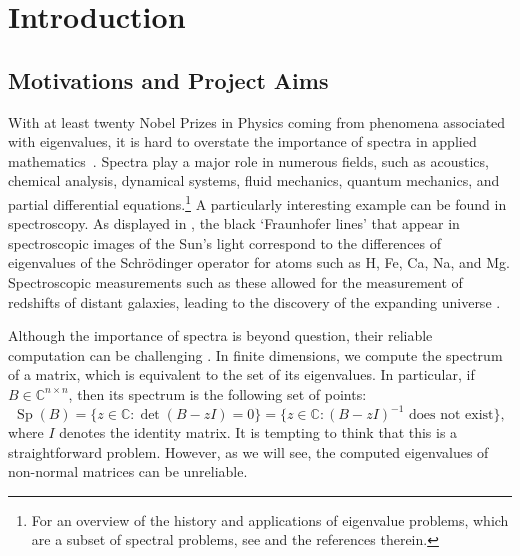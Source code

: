 \chapter{Introduction}

\section{Motivations and  Project Aims}


With at least twenty Nobel Prizes in Physics coming from phenomena associated with eigenvalues, it is hard to overstate the importance of spectra in applied mathematics~\cite{NickEssay}. 
Spectra play a major role in numerous fields, such as acoustics, chemical analysis, dynamical systems, fluid mechanics, quantum mechanics, and partial differential equations.\footnote{For an overview of the history and applications of eigenvalue problems, which are a subset of spectral problems, see \cite[Chapter 1]{Nick} and the references therein.} A particularly interesting example can be found in spectroscopy. As displayed in , the black `Fraunhofer lines' that appear in spectroscopic images of the Sun's light correspond to the differences of eigenvalues of the Schrödinger operator for atoms such as H, Fe, Ca, Na, and Mg. Spectroscopic measurements such as these allowed for the measurement of redshifts of distant galaxies, leading to the discovery of the expanding universe \cite[Chapter~1]{Nick}.


Although the importance of spectra is beyond question, their reliable computation can be challenging \cite{Forward}. 
In finite dimensions, we compute the spectrum of a matrix, which is equivalent to the set of its eigenvalues. In particular, if
$B \in \mathbb{C}^{n\times n}$, then its spectrum is the following set of points:
\begin{equation} \label{matrix spec}
    \operatorname{Sp}(B) = \{z \in \mathbb{C}: \det (B-zI) = 0 \} = \{z \in \mathbb{C}: (B-zI)^{-1} \text{ does not exist} \},
\end{equation}
where $I$ denotes the identity matrix. 
It is tempting to think that this is a straightforward problem. However, as we will see, the computed eigenvalues of non-normal matrices can be unreliable. 

